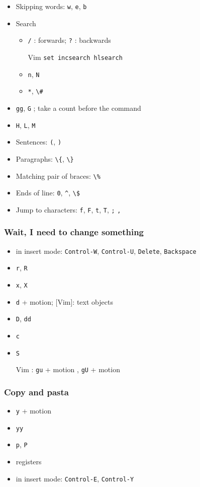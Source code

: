 \documentclass[%
        hyperref={%
                pdfauthor={Zakariyya Mughal},%
                pdfpagemode={None},pdfpagelayout={SinglePage}}%
        xcolor={x11names},%
]{beamer}
\begin{document}
\begin{frame}[allowframebreaks]
\begin{itemize}
\item Skipping words: \Verb+w+, \Verb+e+, \Verb+b+
\item Search
\begin{itemize}
\item \Verb+/+ : forwards; \Verb+?+ : backwards
\item [Vim] \Verb+set incsearch hlsearch+
\item \Verb+n+, \Verb+N+
\item \Verb+*+, \Verb+\#+
\end{itemize}
\item \Verb+gg+, \Verb+G+ ; take a count before the command
\item \Verb+H+, \Verb+L+, \Verb+M+
\item Sentences: \Verb+(+, \Verb+)+
\item Paragraphs: \Verb+\{+, \Verb+\}+
\item Matching pair of braces: \Verb+\%+
\item Ends of line: \Verb+0+, \texttt{\^}, \Verb+\$+ %
\item Jump to characters: \Verb+f+, \Verb+F+, \Verb+t+, \Verb+T+,
\Verb+;+ \Verb+,+
\end{itemize}
\end{frame}

\begin{frame}
\frametitle{Wait, I need to change something}
\begin{itemize}
\item in insert mode: \Verb+Control-W+, \Verb+Control-U+, \Verb+Delete+,
\Verb+Backspace+
\item \Verb+r+, \Verb+R+
\item \Verb+x+, \Verb+X+
\item \Verb+d+ + motion; [Vim]: text objects
\item \Verb+D+, \Verb+dd+
\item \Verb+c+
\item \Verb+S+
\item [Vim]: \Verb+gu+ + motion , \Verb+gU+ + motion
\end{itemize}
\end{frame}

\begin{frame}
\frametitle{Copy and pasta}
\begin{itemize}
\item \Verb+y+ + motion
\item \Verb+yy+
\item \Verb+p+, \Verb+P+
\item registers
\item in insert mode: \Verb+Control-E+, \Verb+Control-Y+
\end{itemize}
\end{frame}
\end{document}
